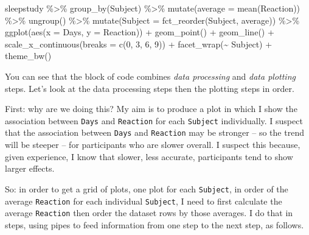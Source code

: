 \documentclass[
  letterpaper,
  DIV=11,
  numbers=noendperiod]{scrreprt}
\newenvironment{Shaded}{\begin{snugshade}}{\end{snugshade}}
\newcommand{\AttributeTok}[1]{\textcolor[rgb]{0.40,0.45,0.13}{#1}}
\newcommand{\DecValTok}[1]{\textcolor[rgb]{0.68,0.00,0.00}{#1}}
\newcommand{\FunctionTok}[1]{\textcolor[rgb]{0.28,0.35,0.67}{#1}}
\newcommand{\NormalTok}[1]{\textcolor[rgb]{0.00,0.23,0.31}{#1}}
\newcommand{\SpecialCharTok}[1]{\textcolor[rgb]{0.37,0.37,0.37}{#1}}
\begin{document}
\begin{Shaded}
\begin{Highlighting}[numbers=left,,]
\NormalTok{sleepstudy }\SpecialCharTok{\%\textgreater{}\%}
  \FunctionTok{group\_by}\NormalTok{(Subject) }\SpecialCharTok{\%\textgreater{}\%}
  \FunctionTok{mutate}\NormalTok{(}\AttributeTok{average =} \FunctionTok{mean}\NormalTok{(Reaction)) }\SpecialCharTok{\%\textgreater{}\%}
  \FunctionTok{ungroup}\NormalTok{() }\SpecialCharTok{\%\textgreater{}\%}
  \FunctionTok{mutate}\NormalTok{(}\AttributeTok{Subject =} \FunctionTok{fct\_reorder}\NormalTok{(Subject, average)) }\SpecialCharTok{\%\textgreater{}\%}
  \FunctionTok{ggplot}\NormalTok{(}\FunctionTok{aes}\NormalTok{(}\AttributeTok{x =}\NormalTok{ Days, }\AttributeTok{y =}\NormalTok{ Reaction)) }\SpecialCharTok{+}
  \FunctionTok{geom\_point}\NormalTok{() }\SpecialCharTok{+} 
  \FunctionTok{geom\_line}\NormalTok{() }\SpecialCharTok{+}
  \FunctionTok{scale\_x\_continuous}\NormalTok{(}\AttributeTok{breaks =} \FunctionTok{c}\NormalTok{(}\DecValTok{0}\NormalTok{, }\DecValTok{3}\NormalTok{, }\DecValTok{6}\NormalTok{, }\DecValTok{9}\NormalTok{)) }\SpecialCharTok{+}
  \FunctionTok{facet\_wrap}\NormalTok{(}\SpecialCharTok{\textasciitilde{}}\NormalTok{ Subject) }\SpecialCharTok{+}
  \FunctionTok{theme\_bw}\NormalTok{()}
\end{Highlighting}
\end{Shaded}

You can see that the block of code combines \emph{data processing} and
\emph{data plotting} steps. Let's look at the data processing steps then
the plotting steps in order.

First: why are we doing this? My aim is to produce a plot in which I
show the association between \texttt{Days} and \texttt{Reaction} for
each \texttt{Subject} individually. I suspect that the association
between \texttt{Days} and \texttt{Reaction} may be stronger -- so the
trend will be steeper -- for participants who are slower overall. I
suspect this because, given experience, I know that slower, less
accurate, participants tend to show larger effects.

So: in order to get a grid of plots, one plot for each \texttt{Subject},
in order of the average \texttt{Reaction} for each individual
\texttt{Subject}, I need to first calculate the average
\texttt{Reaction} then order the dataset rows by those averages. I do
that in steps, using pipes to feed information from one step to the next
step, as follows.
\end{document}
